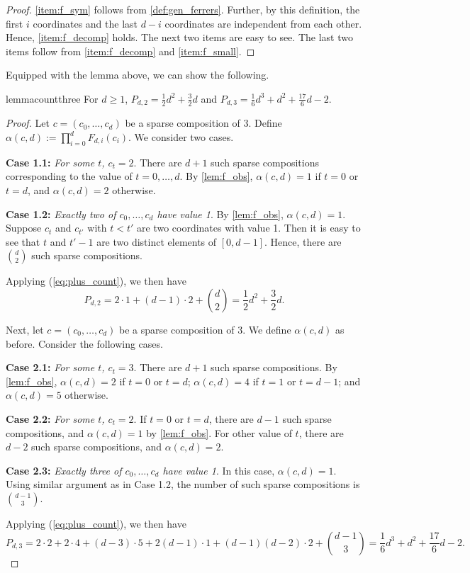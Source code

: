 \documentclass[a4paper,11pt]{amsart}
\begin{document}
\begin{proof}
    \ref{item:f_sym} follows from \cref{def:gen_ferrers}.
    Further, by this definition, the first $i$ coordinates and the last $d-i$ coordinates are independent from each other.
    Hence, \ref{item:f_decomp} holds.
    The next two items are easy to see.
    The last two items follow from \ref{item:f_decomp} and \ref{item:f_small}.
\end{proof}

Equipped with the lemma above, we can show the following.

\begin{restatable}{lemma}{countthree}
    For $d \geq 1$, $P_{d,2} = \frac{1}{2}d^2 + \frac{3}{2}d$ and $P_{d,3} = \frac{1}{6}d^3 + d^2 + \frac{17}{6}d - 2$.
\end{restatable}
\begin{proof}
    Let $c = (c_0, \dots, c_d)$ be a sparse composition of 3.
    Define $\alpha(c,d) := \prod^d_{i=0} F_{d,i}(c_i)$.
    We consider two cases.

    \textbf{Case 1.1:} \textit{For some $t$, $c_t = 2$}.
    There are $d+1$ such sparse compositions corresponding to the value of $t = 0, \dots, d$.
    By \cref{lem:f_obs}, $\alpha(c,d) = 1$ if $t = 0$ or $t = d$, and $\alpha(c,d) = 2$ otherwise. 

    \textbf{Case 1.2:} \textit{Exactly two of $c_0, \dots, c_d$ have value 1}.
    By \cref{lem:f_obs}, $\alpha(c,d) = 1$.
    Suppose $c_t$ and $c_{t'}$  with $t < t'$ are two coordinates with value 1.
    Then it is easy to see that $t$ and $t'-1$ are two distinct elements of $[0,d-1]$.
    Hence, there are $d \choose 2$ such sparse compositions.
    
    Applying (\ref{eq:plus_count}), we then have
    \[
        P_{d,2} = 2 \cdot 1 + (d-1) \cdot 2 + {d \choose 2} = \frac{1}{2}d^2 + \frac{3}{2}d.
    \]

    Next, let $c = (c_0, \dots, c_d)$ be a sparse composition of 3.
    We define $\alpha(c,d)$ as before.
    Consider the following cases.

    \textbf{Case 2.1:} \textit{For some $t$, $c_t = 3$}.
    There are $d+1$ such sparse compositions.
    By \cref{lem:f_obs}, $\alpha(c,d) = 2$ if $t=0$ or $t=d$; $\alpha(c,d) = 4$ if $t=1$ or $t=d-1$; and $\alpha(c,d) = 5$ otherwise.

    \textbf{Case 2.2:} \textit{For some $t$, $c_t = 2$}.
    If $t=0$ or $t=d$, there are $d-1$ such sparse compositions, and $\alpha(c,d) = 1$ by \cref{lem:f_obs}.
    For other value of $t$, there are $d-2$ such sparse compositions, and $\alpha(c,d) = 2$.

    \textbf{Case 2.3:} \textit{Exactly three of $c_0, \dots, c_d$ have value 1}.
    In this case, $\alpha(c,d) = 1$.
    Using similar argument as in Case 1.2, the number of such sparse compositions is $d-1 \choose 3$.

    Applying (\ref{eq:plus_count}), we then have
    \[
        P_{d,3} = 2 \cdot 2 + 2 \cdot 4 + (d-3) \cdot 5 + 2(d-1) \cdot 1 + (d-1)(d-2) \cdot 2 + {d-1 \choose 3} = \frac{1}{6}d^3 + d^2 + \frac{17}{6}d - 2.
    \]
\end{proof}
\end{document}
